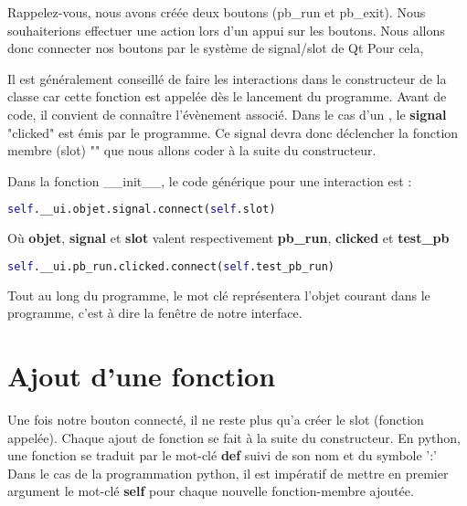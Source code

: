 Rappelez-vous, nous avons créée deux boutons (pb\_run et pb\_exit). Nous souhaiterions effectuer une action lors d'un appui sur les boutons. \newline
Nous allons donc connecter nos boutons par le système de signal/slot de Qt
Pour cela, \newline

Il est généralement conseillé de faire les interactions dans le constructeur de la classe car cette fonction est appelée dès le lancement du programme. \newline
Avant de code, il convient de connaître l'évènement associé. Dans le cas d'un , le \textbf{signal} "clicked" est émis par le programme. \newline
Ce signal devra donc déclencher la fonction membre (slot) "" que nous allons coder à la suite du constructeur. \newline

Dans la fonction \_\_init\_\_, le code générique pour une interaction est  : \newline
\begin{lstlisting}[language=python]
	 self.__ui.objet.signal.connect(self.slot)
\end{lstlisting}
Où \textbf{objet}, \textbf{signal} et \textbf{slot} valent respectivement \textbf{pb\_run}, \textbf{clicked} et \textbf{test\_pb}
\begin{lstlisting}[language=python]
	 self.__ui.pb_run.clicked.connect(self.test_pb_run)
\end{lstlisting}
Tout au long du programme, le mot clé  représentera l'objet courant dans le programme, c'est à dire la fenêtre de notre interface. \newline

\section{Ajout d'une fonction}

Une fois notre bouton connecté, il ne reste plus qu'a créer le slot (fonction appelée). \newline
Chaque ajout de fonction se fait à la suite du constructeur.
En python, une fonction se traduit par le mot-clé \textbf{def} suivi de son nom et du symbole ':' \newline
{\color{red}Dans le cas de la programmation python, il est impératif de mettre en premier argument le mot-clé \textbf{self} pour chaque nouvelle fonction-membre ajoutée.} \newline

